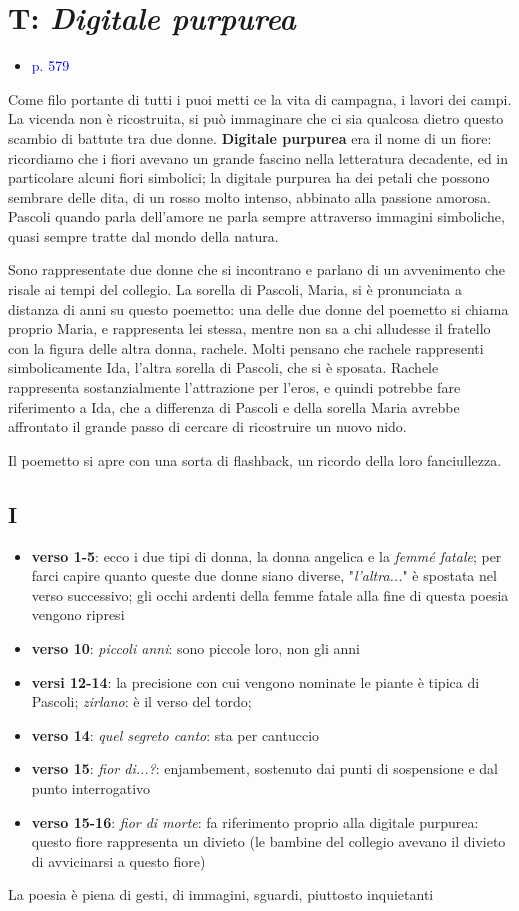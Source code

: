 \documentclass[a4paper, twoside, titlepage]{book}
\newcommand{\elenco}[1]{%
\begin{itemize}
#1
\end{itemize}}
\renewcommand{\emph}[1]{\textcolor{blue}{#1}}
\begin{document}
\section{T: \textit{Digitale purpurea}}

\elenco{\item \emph{p. 579}}

Come filo portante di tutti i puoi metti ce la vita di campagna, i lavori dei campi. La vicenda non è ricostruita, si può immaginare che ci sia qualcosa dietro questo scambio di battute tra due donne. 
\textbf{Digitale purpurea} era il nome di un fiore: ricordiamo che i fiori avevano un grande fascino nella letteratura decadente, ed in particolare alcuni fiori simbolici; la digitale purpurea ha dei petali che possono sembrare delle dita, di un rosso molto intenso, abbinato alla passione amorosa. Pascoli quando parla dell'amore ne parla sempre attraverso immagini simboliche, quasi sempre tratte dal mondo della natura.

Sono rappresentate due donne che si incontrano e parlano di un avvenimento che risale ai tempi del collegio. La sorella di Pascoli, Maria, si è pronunciata a distanza di anni su questo poemetto: una delle due donne del poemetto si chiama proprio Maria, e rappresenta lei stessa, mentre non sa a chi alludesse il fratello con la figura delle altra donna, rachele.
Molti pensano che rachele rappresenti simbolicamente Ida, l'altra sorella di Pascoli, che si è sposata.
Rachele rappresenta sostanzialmente l'attrazione per l'eros, e quindi potrebbe fare riferimento a Ida, che a differenza di Pascoli e della sorella Maria avrebbe affrontato il grande passo di cercare di ricostruire un nuovo nido.

Il poemetto si apre con una sorta di flashback, un ricordo della loro fanciullezza.

\subsection*{I}

\elenco{\item \textbf{verso 1-5}: ecco i due tipi di donna, la donna angelica e la \textit{femmé fatale}; per farci capire quanto queste due donne siano diverse, "\textit{l'altra...}" è spostata nel verso successivo; gli occhi ardenti della femme fatale alla fine di questa poesia vengono ripresi
\item \textbf{verso 10}: \textit{piccoli anni}: sono piccole loro, non gli anni
\item \textbf{versi 12-14}: la precisione con cui vengono nominate le piante è tipica di Pascoli; \textit{zirlano}: è il verso del tordo;
\item \textbf{verso 14}: \textit{quel segreto canto}: sta per cantuccio
\item \textbf{verso 15}: \textit{fior di...?}: enjambement, sostenuto dai punti di sospensione e dal punto interrogativo
\item \textbf{verso 15-16}: \textit{fior di morte}: fa riferimento proprio alla digitale purpurea: questo fiore rappresenta un divieto (le bambine del collegio avevano il divieto di avvicinarsi a questo fiore)
}
La poesia è piena di gesti, di immagini, sguardi, piuttosto inquietanti
\end{document}
